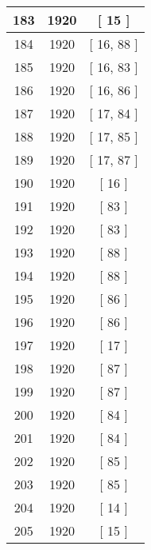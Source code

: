 \begin{center}
\begin{longtable}[H]{|| c c c ||}
\hline
183 & 1920 & [ 15 ] \\ 
\hline
184 & 1920 & [ 16, 88 ] \\ 
\hline
185 & 1920 & [ 16, 83 ] \\ 
\hline
186 & 1920 & [ 16, 86 ] \\ 
\hline
187 & 1920 & [ 17, 84 ] \\ 
\hline
188 & 1920 & [ 17, 85 ] \\ 
\hline
189 & 1920 & [ 17, 87 ] \\ 
\hline
190 & 1920 & [ 16 ] \\ 
\hline
191 & 1920 & [ 83 ] \\ 
\hline
192 & 1920 & [ 83 ] \\ 
\hline
193 & 1920 & [ 88 ] \\ 
\hline
194 & 1920 & [ 88 ] \\ 
\hline
195 & 1920 & [ 86 ] \\ 
\hline
196 & 1920 & [ 86 ] \\ 
\hline
197 & 1920 & [ 17 ] \\ 
\hline
198 & 1920 & [ 87 ] \\ 
\hline
199 & 1920 & [ 87 ] \\ 
\hline
200 & 1920 & [ 84 ] \\ 
\hline
201 & 1920 & [ 84 ] \\ 
\hline
202 & 1920 & [ 85 ] \\ 
\hline
203 & 1920 & [ 85 ] \\ 
\hline
204 & 1920 & [ 14 ] \\ 
\hline
205 & 1920 & [ 15 ] \\ 
\hline
\end{longtable}
\end{center}
